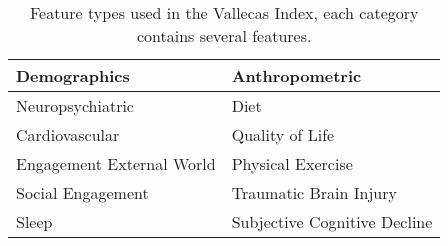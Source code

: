 \documentclass[preprint,12pt]{elsarticle}
\begin{document}
\begin{table}[h!]
  \begin{center}
   \caption{Feature types used in the Vallecas Index, each category contains several features.}
    \label{tab:pvall}
\begin{tabular}{ |p{6cm}||p{6cm}|  }
\hline
Demographics & Anthropometric\\
\hline
Neuropsychiatric & Diet\\
\hline
Cardiovascular & Quality of Life\\
\hline
Engagement External World & Physical Exercise\\
\hline
Social Engagement & Traumatic Brain Injury\\
\hline
Sleep & Subjective Cognitive Decline\\
\hline
\end{tabular}
\end{center}
\end{table}
\end{document}
